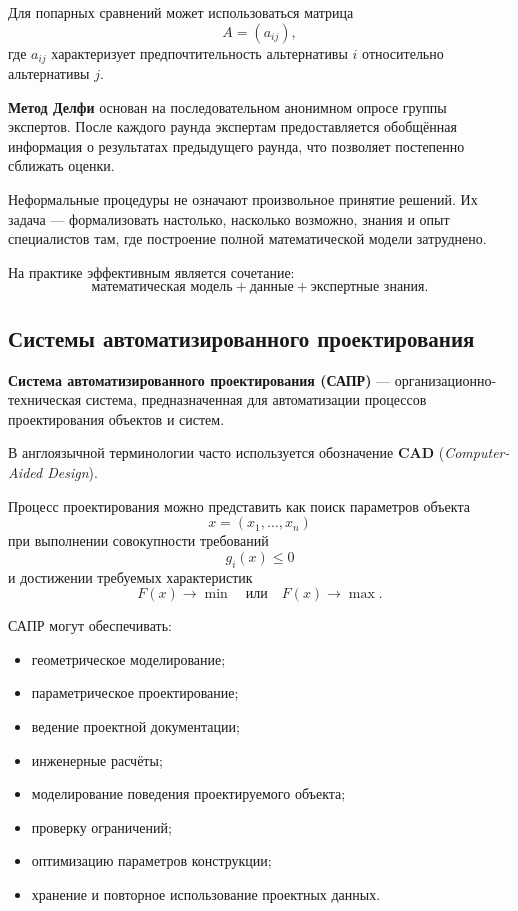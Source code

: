 Для попарных сравнений может использоваться матрица
\[
A=(a_{ij}),
\]
где $a_{ij}$ характеризует предпочтительность альтернативы $i$ относительно альтернативы $j$.

\textbf{Метод Делфи} основан на последовательном анонимном опросе группы экспертов. После каждого раунда экспертам предоставляется обобщённая информация о результатах предыдущего раунда, что позволяет постепенно сближать оценки.

Неформальные процедуры не означают произвольное принятие решений. Их задача --- формализовать настолько, насколько возможно, знания и опыт специалистов там, где построение полной математической модели затруднено.

На практике эффективным является сочетание:
\[
\text{математическая модель}
+
\text{данные}
+
\text{экспертные знания}.
\]

\subsection{Системы автоматизированного проектирования}

\textbf{Система автоматизированного проектирования (САПР)} --- организационно-техническая система, предназначенная для автоматизации процессов проектирования объектов и систем.

В англоязычной терминологии часто используется обозначение \textbf{CAD} (\textit{Computer-Aided Design}).

Процесс проектирования можно представить как поиск параметров объекта
\[
x=(x_1,\ldots,x_n)
\]
при выполнении совокупности требований
\[
g_i(x)\leq 0
\]
и достижении требуемых характеристик
\[
F(x)\rightarrow\min
\quad\text{или}\quad
F(x)\rightarrow\max.
\]

САПР могут обеспечивать:
\begin{itemize}
	\item геометрическое моделирование;
	\item параметрическое проектирование;
	\item ведение проектной документации;
	\item инженерные расчёты;
	\item моделирование поведения проектируемого объекта;
	\item проверку ограничений;
	\item оптимизацию параметров конструкции;
	\item хранение и повторное использование проектных данных.
\end{itemize}

